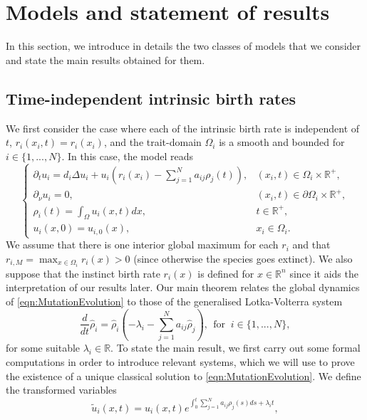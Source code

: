 \documentclass{article}
\begin{document}
\section{Models and statement of results}\label{sec:ModelsStatements}
In this section, we introduce in details the two classes of models that we consider and state the main results obtained for them.
\subsection{Time-independent intrinsic birth rates}
We first consider the case where each of the intrinsic birth rate is independent of $t$, $r_i(x_i,t)=r_i(x_i)$, and the trait-domain $\Omega_i$ is a smooth and bounded for $i\in\{1,...,N\}$. In this case, the model reads
\begin{equation}\label{eqn:MutationEvolution}
      \begin{cases}
          \partial_{t}u_i=d_i\Delta{u}_i+u_i\left(r_i(x_i)-\sum_{j=1}^Na_{ij}\rho_{j}(t)\right),&(x_i,t)\in\Omega_i\times\mathbb{R}^{+},
    \\
    
    \partial_{\nu}u_i=0,&(x_i,t)\in\partial{\Omega_i}\times\mathbb{R}^{+},\\
    \rho_i(t)=\int_{\Omega}u_i(x,t)dx,&t\in\mathbb{R}^{+},\\
    
    u_i(x,0)=u_{i,0}(x),&x_i\in\Omega_i.
      \end{cases}
  \end{equation}
We assume that there is one interior global maximum for each $r_i$ and that $r_{i,M}=\max_{x\in\Omega_i}r_i(x)>0$ (since otherwise the species goes extinct). We also suppose that the instinct birth rate $r_i(x)$ is defined for $x\in\mathbb{R}^n$ since it aids the interpretation of our results later. Our main theorem relates the global dynamics of \eqref{eqn:MutationEvolution} to those of the generalised Lotka-Volterra system
\begin{equation}\label{eqn:GLV_1}
    \frac{d}{dt}\hat{\rho}_i^ {}=\hat{\rho}_{i}^{}\left(-\lambda_i-\sum_{j=1}^{N}a_{ij}\hat{\rho}_j^{}\right),~~\text{for }~i\in\{1,...,N\},
\end{equation}
for some suitable $\lambda_i\in \mathbb{R}$. To state the main result, we first carry out some formal computations in order to introduce relevant systems, which we will use to prove the existence of a unique classical solution to \eqref{eqn:MutationEvolution}. We define the transformed variables \begin{equation}\label{eqn:DecouplingEqn}
    \tilde{u}_i(x,t)=u_i(x,t)e^{\int_{0}^ t\sum_{j=1}^Na_{ij}\rho_j(s)ds+\lambda_it},
\end{equation}
\end{document}
